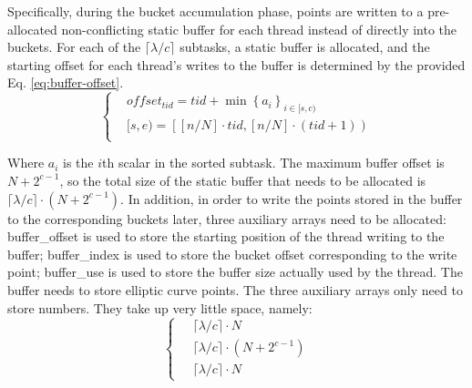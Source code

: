 \documentclass[conference]{IEEEtran}
\begin{document}
Specifically, during the bucket accumulation phase, points are written to a pre-allocated non-conflicting static buffer for each thread instead of directly into the buckets. For each of the $\lceil\lambda/ c \rceil$ subtasks, a static buffer is allocated, and the starting offset for each thread's writes to the buffer is determined by the provided Eq. \ref{eq:buffer-offset}.
\
\begin{equation}
    \label{eq:buffer-offset}
    \left\{\begin{aligned} {{{}}} & {{} {{} {{} o f f s e t_{t i d}=t i d+\operatorname* {m i n} \left\{a_{i} \right\}_{i \in[ s, c )}}}} \\ {{{}}} & {{} {{} {{} [ s, e )=\left[ \left[ n / N \right] \cdot t i d, \left[ n / N \right] \cdot( t i d+1 ) \right)}}} \\ \end{aligned} \right. 
\end{equation}

Where $a_{i}$ is the $i$th scalar in the sorted subtask. The maximum buffer offset is $N+2^{c-1}$, so the total size of the static buffer that needs to be allocated is $\lceil\lambda/ c \rceil\cdot( N+2^{c-1} )$. In addition, in order to write the points stored in the buffer to the corresponding buckets later, three auxiliary arrays need to be allocated: buffer\_offset is used to store the starting position of the thread writing to the buffer; buffer\_index is used to store the bucket offset corresponding to the write point; buffer\_use is used to store the buffer size actually used by the thread. The buffer needs to store elliptic curve points. The three auxiliary arrays only need to store numbers. They take up very little space, namely: 
\begin{equation} \left\{ 
    \begin{aligned} 
        \ & \lceil \lambda / c \rceil \cdot N \\ \ & \lceil \lambda / c \rceil \cdot (N + 2^{c-1}) \\ \ & \lceil \lambda / c \rceil \cdot N 
    \end{aligned} \right. 
\end{equation}
\end{document}
